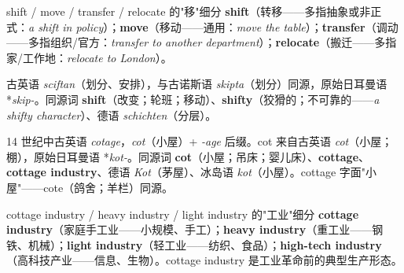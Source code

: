\documentclass[../main.tex]{subfiles}
\begin{document}

\begin{gram}{shift / move / transfer / relocate 的"移"细分}
\textbf{shift}（转移——多指抽象或非正式：\textit{a shift in policy}）；\textbf{move}（移动——通用：\textit{move the table}）；\textbf{transfer}（调动——多指组织/官方：\textit{transfer to another department}）；\textbf{relocate}（搬迁——多指家/工作地：\textit{relocate to London}）。
\end{gram}

\begin{origin}
古英语 \textit{sciftan}（划分、安排），与古诺斯语 \textit{skipta}（划分）同源，原始日耳曼语 *\textit{skip-}。同源词 \textbf{shift}（改变；轮班；移动）、\textbf{shifty}（狡猾的；不可靠的——\textit{a shifty character}）、德语 \textit{schichten}（分层）。
\end{origin}



\begin{origin}
14 世纪中古英语 \textit{cotage}，\textit{cot}（小屋）+ \textit{-age} 后缀。cot 来自古英语 \textit{cot}（小屋；棚），原始日耳曼语 *\textit{kot-}。同源词 \textbf{cot}（小屋；吊床；婴儿床）、\textbf{cottage}、\textbf{cottage industry}、德语 \textit{Kot}（茅屋）、冰岛语 \textit{kot}（小屋）。cottage 字面"小屋"——cote（鸽舍；羊栏）同源。
\end{origin}



\begin{gram}{cottage industry / heavy industry / light industry 的"工业"细分}
\textbf{cottage industry}（家庭手工业——小规模、手工）；\textbf{heavy industry}（重工业——钢铁、机械）；\textbf{light industry}（轻工业——纺织、食品）；\textbf{high-tech industry}（高科技产业——信息、生物）。cottage industry 是工业革命前的典型生产形态。
\end{gram}
\end{document}

